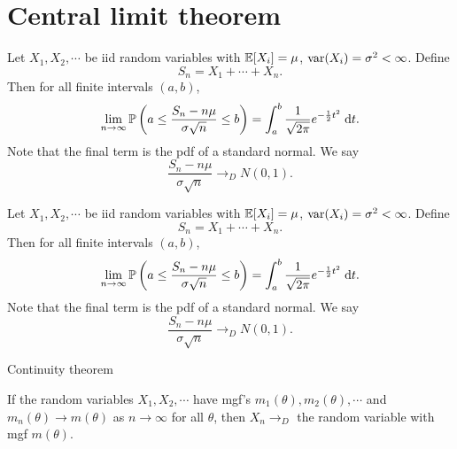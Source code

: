 \section{Central limit theorem}

\begin{note}
  \begin{field}
    \begin{thm}
      Let $X_1, X_2, \cdots$ be iid random variables with $\mathbb{E}[X_i] = \mu$, $\operatorname{var}(X_i) = \sigma^2 < \infty$. Define
      \[
        S_n = X_1 + \cdots + X_n.
      \]
      Then for all finite intervals $(a, b)$,
      \[
        \lim_{n \to \infty}\mathbb{P}\left(a \leq \frac{S_{n} - n\mu}{\sigma\sqrt{n}} \leq b\right) = \int_a^b \frac{1}{\sqrt{2\pi}} e^{-\frac{1}{2}t^2}\;\mathrm{d} t.
      \]
      Note that the final term is the pdf of a standard normal. We say
      \[
        \frac{S_n - n\mu}{\sigma\sqrt{n}} \to_{D} N(0, 1).
      \]
    \end{thm}
  \end{field}
  \begin{field}
    \begin{thm}
      Let $X_1, X_2, \cdots$ be iid random variables with $\mathbb{E}[X_i] = \mu$, $\operatorname{var}(X_i) = \sigma^2 < \infty$. Define
      \[
        S_n = X_1 + \cdots + X_n.
      \]
      Then for all finite intervals $(a, b)$,
      \[
        \lim_{n \to \infty}\mathbb{P}\left(a \leq \frac{S_{n} - n\mu}{\sigma\sqrt{n}} \leq b\right) = \int_a^b \frac{1}{\sqrt{2\pi}} e^{-\frac{1}{2}t^2}\;\mathrm{d} t.
      \]
      Note that the final term is the pdf of a standard normal. We say
      \[
        \frac{S_n - n\mu}{\sigma\sqrt{n}} \to_{D} N(0, 1).
      \]
    \end{thm}
  \end{field}
  \xplain{}%
\end{note}

%
\begin{note}
  \begin{field}
    Continuity theorem
  \end{field}
  \begin{field}
    \begin{thm}
      If the random variables $X_1, X_2, \cdots$ have mgf's $m_1(\theta), m_2(\theta), \cdots$ and $m_n(\theta) \to m(\theta)$ as $n\to\infty$ for all $\theta$, then $X_n \to_D $ the random variable with mgf $m(\theta)$.
    \end{thm}
  \end{field}
  \xplain{}%
\end{note}

